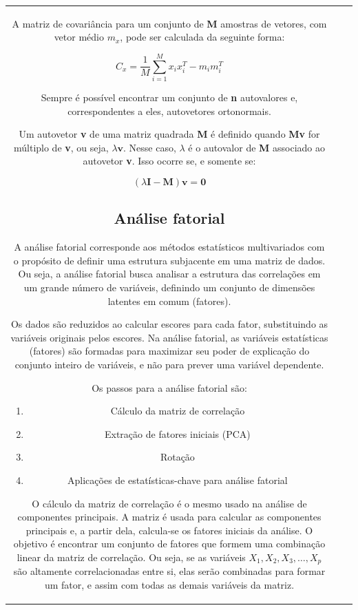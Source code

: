 \documentclass[
]{estat/estat}
\providecommand{\tightlist}{%
  \setlength{\itemsep}{0pt}\setlength{\parskip}{0pt}}\usepackage{longtable,booktabs,array}
\begin{document}
\begin{tabular}{c|cc}
A matriz de covariância para um conjunto de \textbf{M} amostras de
vetores, com vetor médio \(m_{x}\), pode ser calculada da seguinte
forma:

\[
C_{x} = \frac{1}{M} \sum_{i=1}^{M} x_{i} x_{i}^{T} - m_{i} m_{i}^{T}
\]

Sempre é possível encontrar um conjunto de \textbf{n} autovalores e,
correspondentes a eles, autovetores ortonormais.

Um autovetor \textbf{v} de uma matriz quadrada \textbf{M} é definido
quando \textbf{Mv} for múltiplo de \textbf{v}, ou seja,
\(\lambda \mathbf{v}\). Nesse caso, \(\lambda\) é o autovalor de
\textbf{M} associado ao autovetor \textbf{v}. Isso ocorre se, e somente
se:

\[
(\lambda \mathbf{I} - \mathbf{M})\mathbf{v} = \mathbf{0}
\]

\hypertarget{anuxe1lise-fatorial}{%
\subsection{Análise fatorial}\label{anuxe1lise-fatorial}}

A análise fatorial corresponde aos métodos estatísticos multivariados
com o propósito de definir uma estrutura subjacente em uma matriz de
dados. Ou seja, a análise fatorial busca analisar a estrutura das
correlações em um grande número de variáveis, definindo um conjunto de
dimensões latentes em comum (fatores).

Os dados são reduzidos ao calcular escores para cada fator, substituindo
as variáveis originais pelos escores. Na análise fatorial, as variáveis
estatísticas (fatores) são formadas para maximizar seu poder de
explicação do conjunto inteiro de variáveis, e não para prever uma
variável dependente.

Os passos para a análise fatorial são:

\begin{enumerate}
\def\labelenumi{\arabic{enumi}.}
\tightlist
\item
  Cálculo da matriz de correlação
\item
  Extração de fatores iniciais (PCA)
\item
  Rotação
\item
  Aplicações de estatísticas-chave para análise fatorial
\end{enumerate}

O cálculo da matriz de correlação é o mesmo usado na análise de
componentes principais. A matriz é usada para calcular as componentes
principais e, a partir dela, calcula-se os fatores iniciais da análise.
O objetivo é encontrar um conjunto de fatores que formem uma combinação
linear da matriz de correlação. Ou seja, se as variáveis
\(X_1, X_2, X_3, \ldots, X_p\) são altamente correlacionadas entre si,
elas serão combinadas para formar um fator, e assim com todas as demais
variáveis da matriz.


\end{tabular}
\end{document}
